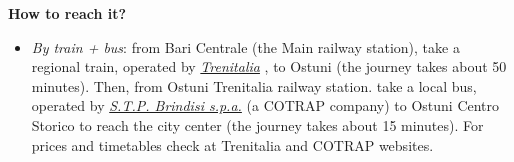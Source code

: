 \documentclass[
	openany, %
	parskip=full, %
	12pt, %
	a4paper, %
]{conferencebooklet} %
\newcommand\smallbull{\scaleobj{0.7}{\blacksquare}}
\newcommand\itema{\item[\textcolor{case_blue}{$\smallbull$}]}
\begin{document}
\newpage
\begin{adjustwidth}{10pt}{20pt}
\begin{table}[h!]
\end{table}
\vspace{-3mm}
\textbf{How to reach it?}
\vspace{-5mm}
\begin{itemize}[leftmargin=*, noitemsep]
    \itema \textit{By train + bus}: from Bari Centrale (the Main railway station), take a regional train, operated by \color{blue}\href{https://www.trenitalia.com/en.html}{\textit{Trenitalia}} \color{black}, to Ostuni (the journey takes about 50 minutes). Then, from Ostuni Trenitalia railway station. take a local bus, operated by \color{blue}\href{https://biglietteria.cotrap.it/#/ricerca}{\textit{S.T.P. Brindisi s.p.a.}} \color{black} (a COTRAP company) to Ostuni Centro Storico to reach the city center (the journey takes about 15 minutes). For prices and timetables check at Trenitalia and COTRAP websites.
\end{itemize}


\end{adjustwidth}
\end{document}
